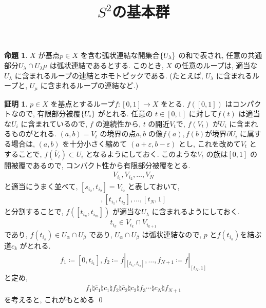 \documentclass[10pt, fleqn, label-section=none]{bxjsarticle}
\title{$S^2$の基本群}
\date{}
\author{}
\theoremstyle{definition}
\newtheorem{prop}[dfn]{命題}
\newtheorem*{pf*}{証明}
\newcommand{\veps}{\varepsilon}
\newcommand{\cbra}[1]{\mleft\{#1\mright\}}
\renewcommand{\;}{\, ; \,}
\begin{document}
\maketitle

\section{}


\begin{prop}
$X$ が基点$p \in X$ を含む弧状連結な開集合$\cbra{U_\lambda}$ の和で表され, 任意の共通部分$U_\lambda \cap U_ \lambda \mu$ は弧状連結であるとする. このとき, $X$ の任意のループは, 適当な$U_\lambda$ に含まれるループの連結とホモトピックである. (たとえば, $U_\lambda$ に含まれるループと, $U_\mu$ に含まれるループの連結など.) 
\end{prop}
\begin{pf*}
$p\in X $ を基点とするループ$f: [0, 1] \rightarrow X$ をとる. $f([0,1])$ はコンパクトなので,  有限部分被覆$\cbra{U_i}$ がとれる. 任意の $t \in [0, 1]$ に対して$f(t)$ は適当な$U_i$ に含まれているので, $f$ の連続性から, $t$ の開近$V_t$で, $f(V_t)$ が$U_i$ に含まれるものがとれる. $(a, b) = V_t$ の境界の点$a, b$ の像$f(a), f(b)$が境界$\partial U_i$ に属する場合は, $(a, b)$ を十分小さく縮めて $(a + \veps, b - \veps)$ とし, これを改めて$V_t$ とすることで, $f(\overline V_t) \subset U_i$ となるようにしておく. このような$V_t$ の族は$[0, 1]$ の開被覆であるので, コンパクト性から有限部分被覆をとる. 
\begin{align*} V_{i_1}, V_{i_2} , \ldots , V_N \end{align*}
と適当にうまく並べて, $[s_{i_2}, t_{i_2}] = V_{i_2}$ と表しておいて, 
\begin{align*} [0, t_{i_1}], [t_{i_1}, t_{i_2}]  , \ldots , [t_{N}, 1] \end{align*}
と分割することで, $f([t_{i_n}, t_{i_m}]) $ が適当な$U_\lambda$ に含まれるようにしておく. 
\begin{align*} t_{i_k}  \in V_{i_k} \cap V_{i_{k+1}} \end{align*} 
であり, $f(t_{i_k}) \in U_\alpha \cap U_\beta$ であり, $U_\alpha \cap U_\beta$ は弧状連結なので, $p$ と$f(t_{i_k}) $を結ぶ道$c_k$ がとれる. 
\begin{align*} f_1 \coloneqq [0, t_{i_1}], f_2 \coloneqq f|_{[t_{i_1}, t_{i_2}]}, \ldots , f_{N+1} \coloneqq f|_{[t_{N}, 1]} \end{align*}
と定め, 
\begin{align*} f_1 \natural \bar c_1 \natural c_1 \natural f_2 \natural \bar c_2 \natural c_2 \natural f_3 \cdots \natural c_{N}  \natural f_{N+1}  \end{align*}
を考えると, これがもとめる
\qed
\end{pf*}
\end{document}
